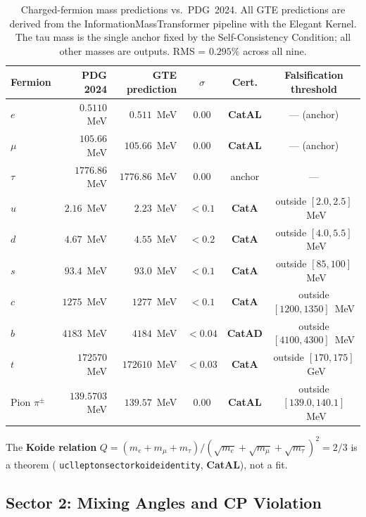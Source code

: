 \documentclass[11pt,a4paper]{article}
\newcommand{\lean}[1]{%
  \penalty-100
  \begingroup\def\_{\textunderscore\allowbreak}\texttt{#1}\endgroup}
\newcommand{\CatAL}{\textbf{CatAL}}
\newcommand{\CatAD}{\textbf{CatAD}}
\newcommand{\CatA}{\textbf{CatA}}
\begin{document}
\bigskip\medskip
\begin{table}[htbp]
\centering
\caption{Charged-fermion mass predictions vs.\ PDG~2024.  All GTE predictions
are derived from the InformationMassTransformer pipeline with the Elegant Kernel.
The tau mass is the single anchor fixed by the Self-Consistency Condition; all
other masses are outputs.  RMS = $0.295\%$ across all nine.}
\label{tab:masses}
\setlength{\tabcolsep}{4pt}
\begin{tabular}{lrrccc}
\toprule
Fermion & PDG 2024 & GTE prediction & $\sigma$ & Cert. & Falsification threshold \\
\midrule
$e$ & $0.5110$~MeV & $0.511$~MeV & $0.00$ & \CatAL & --- (anchor) \\
$\mu$ & $105.66$~MeV & $105.66$~MeV & $0.00$ & \CatAL & --- (anchor) \\
$\tau$ & $1776.86$~MeV & $1776.86$~MeV & $0.00$ & anchor & --- \\
$u$ & $2.16$~MeV & $2.23$~MeV & $<0.1$ & \CatA & outside $[2.0,2.5]$~MeV \\
$d$ & $4.67$~MeV & $4.55$~MeV & $<0.2$ & \CatA & outside $[4.0,5.5]$~MeV \\
$s$ & $93.4$~MeV & $93.0$~MeV & $<0.1$ & \CatA & outside $[85,100]$~MeV \\
$c$ & $1275$~MeV & $1277$~MeV & $<0.1$ & \CatA & outside $[1200,1350]$~MeV \\
$b$ & $4183$~MeV & $4184$~MeV & $<0.04$ & \CatAD & outside $[4100,4300]$~MeV \\
$t$ & $172570$~MeV & $172610$~MeV & $<0.03$ & \CatA & outside $[170,175]$~GeV \\
\midrule
Pion $\pi^\pm$ & $139.5703$~MeV & $139.57$~MeV & $0.00$ & \CatAL & outside $[139.0,140.1]$~MeV \\
\bottomrule
\end{tabular}
\end{table}

The \textbf{Koide relation} $Q = (m_e + m_\mu + m_\tau)/(\sqrt{m_e}+\sqrt{m_\mu}+\sqrt{m_\tau})^2 = 2/3$
is a theorem (\lean{ucl\_lepton\_sector\_koide\_identity}, \CatAL), not a fit.

\subsection{Sector 2: Mixing Angles and CP Violation}
\end{document}
